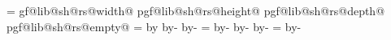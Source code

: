 {{                                \pgf@yb=\dp\pgf@lib@sh@box%
                            \fi%
                        \fi%
                    \fi%
                \fi%
                \expandafter\edef\csname pgf@lib@sh@rs@width@\pgf@lib@sh@rs@number\endcsname{\the\pgf@xa}%
                \expandafter\edef\csname pgf@lib@sh@rs@height@\pgf@lib@sh@rs@number\endcsname{\the\pgf@ya}%
                \expandafter\edef\csname pgf@lib@sh@rs@depth@\pgf@lib@sh@rs@number\endcsname{\the\pgf@yb}%
                \expandafter\addtosavedmacro\csname pgf@lib@sh@rs@empty@\pgf@lib@sh@rs@number\endcsname%
                \ifdim\pgf@xa>\pgf@x%
                    \pgf@x=\pgf@xa%
                \fi%
                \ifdim\pgf@ya>\pgfutil@tempdima%
                    \pgfutil@tempdima=\pgf@ya%
                \fi%
                \ifdim\pgf@yb>\pgfutil@tempdimb%
                    \pgfutil@tempdimb=\pgf@yb%
                \fi%
                \pgf@yc=\pgfutil@tempdima%
                \advance\pgf@yc by\pgfutil@tempdimb%
                \ifdim\pgf@yc>\pgf@y%
                    \pgf@y=\pgf@yc%
                \fi%
        \repeatpgfmathloop%
        \edef\pgf@lib@sh@rs@max@width{\the\pgf@x}%
        \edef\pgf@lib@sh@rs@max@totalheight{\the\pgf@y}%
        \pgfmathsetlength{}%
        \advance\pgf@x by-\innerxsep\relax%
        \advance\pgf@x by-\innerxsep\relax%
        \pgf@xa=\pgf@x%
        \advance\pgf@xa by-\pgf@lib@sh@rs@max@width\relax%
        \ifdim\pgf@xa>0pt\relax%
            \edef\pgf@lib@sh@rs@max@width{\the\pgf@x}%
        \fi%
        \pgfmathsetlength{}%
        \advance\pgf@y by-\innerysep\relax%
        \advance\pgf@y by-\innerysep\relax%
        \pgf@ya=\pgf@y%
        \advance\pgf@ya by-\pgf@lib@sh@rs@max@totalheight\relax%
        \ifdim\pgf@ya>0pt\relax%
            \edef\pgf@lib@sh@rs@max@totalheight{\the\pgf@y}%
        \fi%
        \ifpgfrectanglesplithorizontal%
            \pgf@x=0pt\relax%
}}
